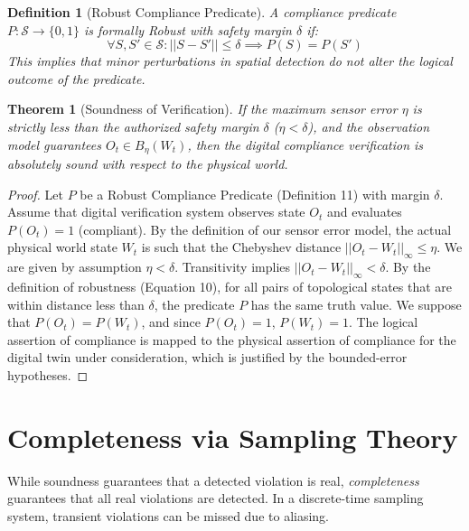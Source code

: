 \documentclass[conference]{IEEEtran}
\newtheorem{theorem}{Theorem}
\newtheorem{definition}{Definition}
\newcommand{\Sstate}{\mathcal{S}} %
\begin{document}
\begin{definition}[Robust Compliance Predicate]
A compliance predicate $P: \Sstate \to \{0, 1\}$ is formally \textit{Robust} with safety margin $\delta$ if:
\begin{equation}
\forall S, S' \in \Sstate: ||S - S'|| \le \delta \implies P(S) = P(S')
\end{equation}
This implies that minor perturbations in spatial detection do not alter the logical outcome of the predicate.
\end{definition}

\begin{theorem}[Soundness of Verification]
If the maximum sensor error $\eta$ is strictly less than the authorized safety margin $\delta$ ($\eta < \delta$), and the observation model guarantees $O_t \in B_\eta(W_t)$, then the digital compliance verification is absolutely sound with respect to the physical world.
\end{theorem}

\begin{proof}
Let $P$ be a Robust Compliance Predicate (Definition 11) with margin $\delta$. Assume that digital verification system observes state $O_t$ and evaluates $P(O_t) = 1$ (compliant). By the definition of our sensor error model, the actual physical world state $W_t$ is such that the Chebyshev distance $||O_t - W_t||_\infty \le \eta$. We are given by assumption $\eta < \delta$. Transitivity implies $||O_t - W_t||_\infty < \delta$. By the definition of robustness (Equation 10), for all pairs of topological states that are within distance less than $\delta$, the predicate $P$ has the same truth value. We suppose that $P(O_t) = P(W_t)$, and since $P(O_t) = 1$, $P(W_t) = 1$. The logical assertion of compliance is mapped to the physical assertion of compliance for the digital twin under consideration, which is justified by the bounded-error hypotheses.
\end{proof}

\section{Completeness via Sampling Theory}

While soundness guarantees that a detected violation is real, \textit{completeness} guarantees that all real violations are detected. In a discrete-time sampling system, transient violations can be missed due to aliasing.
\end{document}
